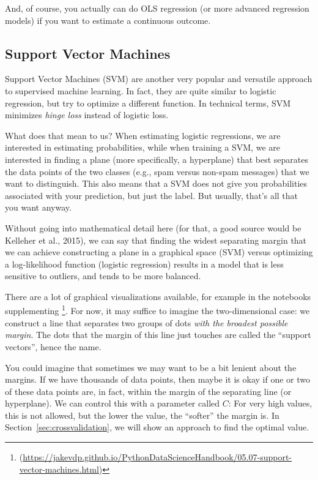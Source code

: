And, of course, you actually can do OLS regression (or more advanced
regression models) if you want to estimate a continuous outcome.





\subsection{Support Vector Machines}\label{sec:svm}
Support Vector Machines (SVM) are another very popular and versatile
approach to supervised machine learning.  In fact, they are quite
similar to logistic regression, but try to optimize a different
function. In technical terms, SVM minimizes \emph{hinge loss} instead
of logistic loss.

What does that mean to us? When estimating logistic regressions, we
are interested in estimating probabilities, while when training a
SVM, we are interested in finding a plane (more
specifically, a hyperplane) that best separates the data points of the
two classes (e.g., spam versus non-spam messages) that we want to
distinguish.  This also means that a SVM does not give you
probabilities associated with your prediction, but just the label.
But usually, that's all that you want anyway.

Without going into mathematical detail here (for that, a good source
would be Kelleher et al., 2015), we can say that finding the
widest separating margin that we can achieve constructing a plane in a
graphical space (SVM) versus optimizing a log-likelihood function
(logistic regression) results in a model that is less sensitive to
outliers, and tends to be more balanced.

There are a lot of graphical visualizations available, for example in
the notebooks supplementing \cite{vanderplas2016python} \footnote{(\url{https://jakevdp.github.io/PythonDataScienceHandbook/05.07-support-vector-machines.html})}.
For now, it may suffice to imagine the two-dimensional case: we
construct a line that separates two groups of dots \emph{with the
  broadest possible margin}. The dots that the margin of this line
just touches are called the ``support vectors'', hence the name.

You could imagine that sometimes we may want to be a bit lenient
about the margins. If we have thousands of data points, then maybe it
is okay if one or two of these data points are, in fact, within the
margin of the separating line (or hyperplane). We can control this with
a parameter called $C$: For very high values, this is not allowed, but
the lower the value, the ``softer'' the margin is.  In
Section~\ref{sec:crossvalidation}, we will show an approach to find
the optimal value.

